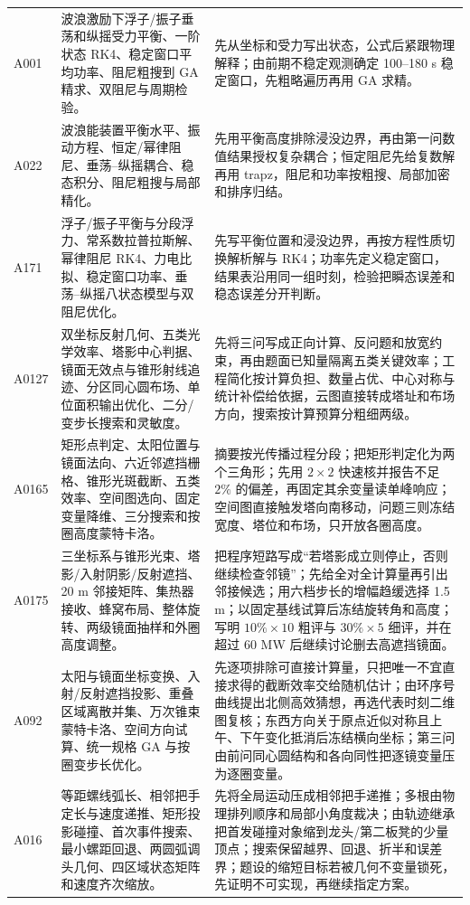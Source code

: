 \begin{longtable}{p{1.4cm}p{5.2cm}p{7.0cm}}
A001 & 波浪激励下浮子/振子垂荡和纵摇受力平衡、一阶状态 RK4、稳定窗口平均功率、阻尼粗搜到 GA 精求、双阻尼与周期检验。 &
先从坐标和受力写出状态，公式后紧跟物理解释；由前期不稳定观测确定 100--180 s 稳定窗口，先粗略遍历再用 GA 求精。\\
A022 & 波浪能装置平衡水平、振动方程、恒定/幂律阻尼、垂荡--纵摇耦合、稳态积分、阻尼粗搜与局部精化。 &
先用平衡高度排除浸没边界，再由第一问数值结果授权复杂耦合；恒定阻尼先给复数解再用 trapz，阻尼和功率按粗搜、局部加密和排序归结。\\
A171 & 浮子/振子平衡与分段浮力、常系数拉普拉斯解、幂律阻尼 RK4、力电比拟、稳定窗口功率、垂荡--纵摇八状态模型与双阻尼优化。 &
先写平衡位置和浸没边界，再按方程性质切换解析解与 RK4；功率先定义稳定窗口，结果表沿用同一组时刻，检验把瞬态误差和稳态误差分开判断。\\
A0127 & 双坐标反射几何、五类光学效率、塔影中心判据、镜面无效点与锥形射线追迹、分区同心圆布场、单位面积输出优化、二分/变步长搜索和灵敏度。 &
先将三问写成正向计算、反问题和放宽约束，再由题面已知量隔离五类关键效率；工程简化按计算负担、数量占优、中心对称与统计补偿给依据，云图直接转成塔址和布场方向，搜索按计算预算分粗细两级。\\
A0165 & 矩形点判定、太阳位置与镜面法向、六近邻遮挡栅格、锥形光斑截断、五类效率、空间图选向、固定变量降维、三分搜索和按圈高度蒙特卡洛。 &
摘要按光传播过程分段；把矩形判定化为两个三角形；先用 $2\times2$ 快速核并报告不足 $2\%$ 的偏差，再固定其余变量读单峰响应；空间图直接触发塔向南移动，问题三则冻结宽度、塔位和布场，只开放各圈高度。\\
A0175 & 三坐标系与锥形光束、塔影/入射阴影/反射遮挡、20 m 邻接矩阵、集热器接收、蜂窝布局、整体旋转、两级镜面抽样和外圈高度调整。 &
把程序短路写成“若塔影成立则停止，否则继续检查邻镜”；先给全对全计算量再引出邻接候选；用六档步长的增幅趋缓选择 1.5 m；以固定基线试算后冻结旋转角和高度；写明 $10\%\times10$ 粗评与 $30\%\times5$ 细评，并在超过 60 MW 后继续讨论删去高遮挡镜面。\\
A092 & 太阳与镜面坐标变换、入射/反射遮挡投影、重叠区域离散并集、万次锥束蒙特卡洛、空间方向试算、统一规格 GA 与按圈变步长优化。 &
先逐项排除可直接计算量，只把唯一不宜直接求得的截断效率交给随机估计；由环序号曲线提出北侧高效猜想，再选代表时刻二维图复核；东西方向关于原点近似对称且上午、下午变化抵消后冻结横向坐标；第三问由前问同心圆结构和各向同性把逐镜变量压为逐圈变量。\\
A016 & 等距螺线弧长、相邻把手定长与速度递推、矩形投影碰撞、首次事件搜索、最小螺距回退、两圆弧调头几何、四区域状态矩阵和速度齐次缩放。 &
先将全局运动压成相邻把手递推；多根由物理排列顺序和局部小角度裁决；由轨迹继承把首发碰撞对象缩到龙头/第二板凳的少量顶点；搜索保留越界、回退、折半和误差界；题设的缩短目标若被几何不变量锁死，先证明不可实现，再继续指定方案。\\

\end{longtable}
